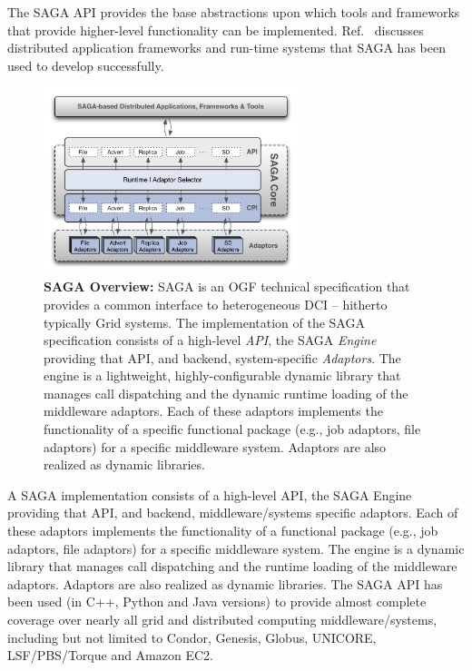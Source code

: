 \documentclass[]{svjour3}
\begin{document}
The SAGA API provides the base abstractions upon which tools and
frameworks that provide higher-level functionality can be
implemented. Ref.~\cite{saga_url} discusses distributed application
frameworks and run-time systems that SAGA has been used to develop
successfully. 


\begin{figure}[t]
\centering \includegraphics[width=0.66\textwidth]{figures/saga-architecture-1.png}
\caption{\textbf{SAGA Overview: } SAGA is an OGF technical
  specification that provides a common interface to heterogeneous DCI
  -- hitherto typically Grid systems.  The implementation of the
  SAGA\cite{saga_url} specification consists of a high-level {\it
    API}, the SAGA {\it Engine} providing that API, and backend,
  system-specific {\it Adaptors}.  The engine is a lightweight,
  highly-configurable dynamic library that manages call dispatching
  and the dynamic runtime loading of the middleware adaptors.  Each of
  these adaptors implements the functionality of a specific functional
  package (e.g., job adaptors, file adaptors) for a specific
  middleware system. Adaptors are also realized as dynamic libraries.}
 \label{fig:saga-overview}
\end{figure}

A SAGA implementation consists of a high-level API, the SAGA
Engine providing that API, and backend, middleware/systems specific
adaptors. Each of these adaptors implements the functionality of
a functional package (e.g., job adaptors, file adaptors) for a
specific middleware system. The engine is a dynamic library that
manages call dispatching and the runtime loading of the middleware
adaptors. Adaptors are also realized as dynamic libraries. The SAGA
API has been used (in C++, Python and Java versions) to provide almost
complete coverage over nearly all grid and distributed computing
middleware/systems, including but not limited to Condor, Genesis,
Globus, UNICORE, LSF/PBS/Torque and Amazon EC2.
\end{document}
